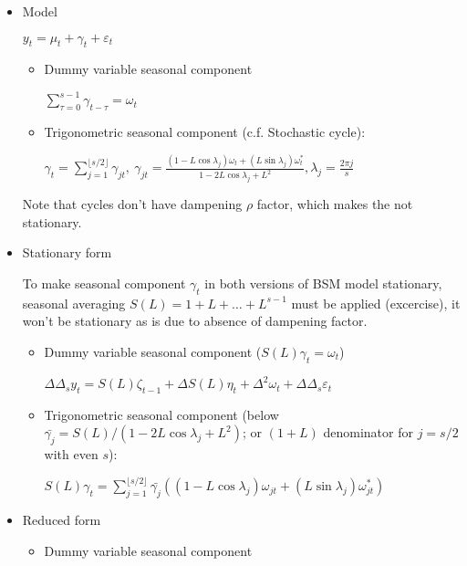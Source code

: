 \documentclass[12pt]{article}
\theoremstyle{definition}
\theoremstyle{remark}
\numberwithin{equation}{section}
\begin{document}
\begin{itemize}
	\item Model

	$y_t =\mu_t + \gamma_t + \varepsilon_t$

	\begin{itemize}
		\item Dummy variable seasonal component

		$\displaystyle \sum_{\tau = 0}^{s-1} \gamma_{t-\tau} = \omega_t$

		\item Trigonometric seasonal component (c.f. Stochastic cycle):

		$\displaystyle \gamma_t = \sum_{j=1}^{\lfloor s/2 \rfloor} \gamma_{jt},\ \gamma_{jt} = \frac{(1-L\cos\lambda_j)\omega_t + (L\sin\lambda_j)\omega_t^*}{1-2L\cos\lambda_j+L^2}, \lambda_j = \frac {2\pi j}s$

	\end{itemize}

	Note that cycles don't have dampening $\rho$ factor, which makes the not stationary.

	\item Stationary form

	To make seasonal component $\gamma_t$ in both versions of BSM model stationary, seasonal averaging $S(L) = 1+L+\ldots + L^{s-1}$ must be applied (excercise), it won't be stationary as is due to absence of dampening factor.

	\begin{itemize}
		\item Dummy variable seasonal component ($S(L)\gamma_t = \omega_t$)

		$\Delta \Delta_s y_t = S(L)\zeta_{t-1} + \Delta S(L)\eta_t + \Delta^2\omega_t+\Delta \Delta_s\varepsilon_t$


		\item Trigonometric seasonal component (below $\bar{\gamma_j} = S(L)/(1-2L\cos \lambda_j + L^2)$; or $(1+L)$ denominator for $j=s/2$ with even $s$):

		$\displaystyle S(L)\gamma_t = \sum_{j=1}^{\lfloor s/2 \rfloor} \bar{\gamma_j}\left( (1-L\cos\lambda_j)\omega_{jt} + (L\sin\lambda_j)\omega_{jt}^*\right)$

	\end{itemize}

	\item Reduced form

	\begin{itemize}
		\item Dummy variable seasonal component


\end{itemize}
\end{itemize}
\end{document}
